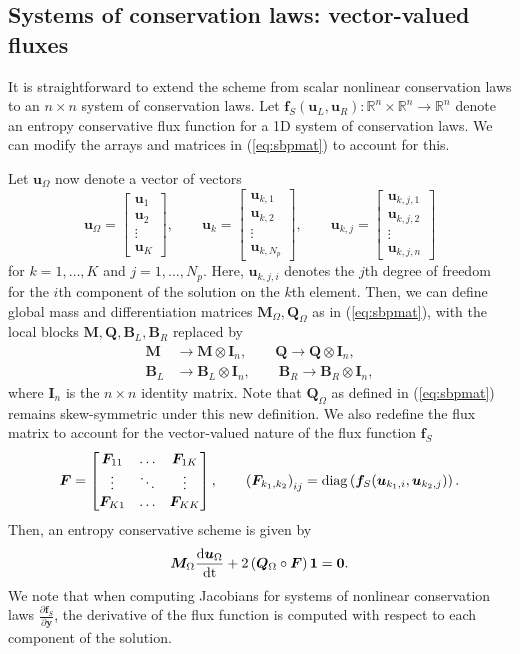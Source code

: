 \documentclass{article}
\newcommand{\diag}[1]{{\rm diag}\LRp{#1}}
\newcommand{\td}[2]{\frac{{\rm d}#1}{{\rm d}{\rm #2}}}
\newcommand{\pd}[2]{\frac{\partial#1}{\partial#2}}
\newcommand{\LRp}[1]{\left( #1 \right)}
\newcommand{\note}[1]{{\color{blue}{#1}}}
\newcommand{\eq}[1]{\begin{align*}#1\end{align*}}
\newcommand{\eqlab}[1]{\begin{align}#1\end{align}}
\newcommand{\bmat}[1]{\begin{bmatrix}#1\end{bmatrix}}
\begin{document}
\subsection{Systems of conservation laws: vector-valued fluxes}
\label{sec:systems}

It is straightforward to extend the scheme from scalar nonlinear conservation laws to an $n\times n$ system of conservation laws.  Let $\bm{f}_{S}(\bm{u}_L,\bm{u}_R): \mathbb{R}^{n}\times \mathbb{R}^n \rightarrow \mathbb{R}^n$ denote an entropy conservative flux function for a 1D system of conservation laws.  We can modify the arrays and matrices in (\ref{eq:sbpmat}) to account for this.

Let $\bm{u}_{\Omega}$ now denote a vector of vectors 
\[
\bm{u}_{\Omega} = \bmat{\bm{u}_1\\
\bm{u}_2\\
\vdots\\
\bm{u}_K}, \qquad \bm{u}_k = \bmat{
\bm{u}_{k,1}\\
\bm{u}_{k,2}\\
\vdots\\
\bm{u}_{k,N_p}
}, \qquad
\bm{u}_{k,j} = \bmat{
\bm{u}_{k,j,1}\\
\bm{u}_{k,j,2}\\
\vdots\\
\bm{u}_{k,j,n}
}
\]
for $k = 1,\ldots, K$ and $j = 1,\ldots, N_p$.  Here, $\bm{u}_{k,j,i}$ denotes the $j$th degree of freedom for the $i$th component of the solution on the $k$th element.   Then, we can define global mass and differentiation matrices $\bm{M}_{\Omega}, \bm{Q}_{\Omega}$ as in (\ref{eq:sbpmat}), with the local blocks $\bm{M}, \bm{Q},\bm{B}_L, \bm{B}_R$ replaced by 
\eq{
\bm{M} &\longrightarrow \bm{M} \otimes \bm{I}_n, \qquad 
\bm{Q} \longrightarrow \bm{Q} \otimes \bm{I}_n,\\
\bm{B}_L &\longrightarrow \bm{B}_L \otimes \bm{I}_n, \qquad 
\bm{B}_R \longrightarrow \bm{B}_R \otimes \bm{I}_n,
}
where $\bm{I}_n$ is the $n\times n$ identity matrix.  Note that $\bm{Q}_{\Omega}$ as defined in (\ref{eq:sbpmat}) remains skew-symmetric under this new definition.  We also redefine the flux matrix to account for the vector-valued nature of the flux function $\bm{f}_S$ 
\eqlab{
\bm{F} = \bmat{
\bm{F}_{11} & \ldots & \bm{F}_{1K}\\
\vdots & \ddots & \vdots\\
\bm{F}_{K1} & \ldots & \bm{F}_{KK}
}, \qquad \LRp{\bm{F}_{k_1,k_2}}_{ij} = \diag{\bm{f}_S(\bm{u}_{k_1,i}, \bm{u}_{k_2,j})}.\label{eq:fluxsystem}
}
Then, an entropy conservative scheme is given by
\[
\bm{M}_{\Omega}\td{\bm{u}_{\Omega}}{t} + 2\LRp{ \bm{Q}_{\Omega} \circ \bm{F}}\bm{1} = \bm{0}.
\]
We note that when computing Jacobians for systems of nonlinear conservation laws $\pd{\bm{f}_S}{\bm{y}}$, the derivative of the flux function is computed with respect to each component of the solution.
\end{document}
